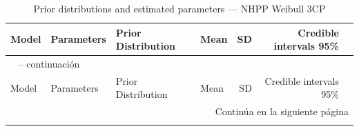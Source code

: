 \begin{longtable}{llllrrr}
\caption{Prior distributions and estimated parameters --- NHPP Weibull 3CP} \label{tab:nhpp_params_3cp} \\
\toprule
Model & Parameters & Prior Distribution & Mean & SD & Credible intervals 95\% \\
\midrule
\endfirsthead

\multicolumn{7}{l}{\tablename\ \thetable{} -- continuaci\'{o}n} \\
\toprule
Model & Parameters & Prior Distribution & Mean & SD & Credible intervals 95\% \\
\midrule
\endhead

\midrule
\multicolumn{7}{r}{Contin\'{u}a en la siguiente p\'{a}gina} \\
\endfoot

\bottomrule
\endlastfoot


\end{longtable}
